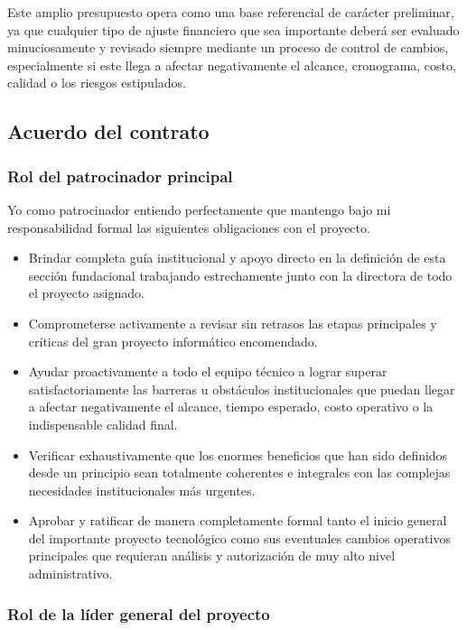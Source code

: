 \documentclass[11pt,spanish]{article}
\begin{document}
Este amplio presupuesto opera como una base referencial de carácter preliminar, ya que cualquier tipo de ajuste financiero que sea importante deberá ser evaluado minuciosamente y revisado siempre mediante un proceso de control de cambios, especialmente si este llega a afectar negativamente el alcance, cronograma, costo, calidad o los riesgos estipulados.

\subsection{Acuerdo del contrato}

\subsubsection{Rol del patrocinador principal}

Yo como patrocinador entiendo perfectamente que mantengo bajo mi responsabilidad formal las siguientes obligaciones con el proyecto.

\begin{itemize}
    \item Brindar completa guía institucional y apoyo directo en la definición de esta sección fundacional trabajando estrechamente junto con la directora de todo el proyecto asignado.
    \item Comprometerse activamente a revisar sin retrasos las etapas principales y críticas del gran proyecto informático encomendado.
    \item Ayudar proactivamente a todo el equipo técnico a lograr superar satisfactoriamente las barreras u obstáculos institucionales que puedan llegar a afectar negativamente el alcance, tiempo esperado, costo operativo o la indispensable calidad final.
    \item Verificar exhaustivamente que los enormes beneficios que han sido definidos desde un principio sean totalmente coherentes e integrales con las complejas necesidades institucionales más urgentes.
    \item Aprobar y ratificar de manera completamente formal tanto el inicio general del importante proyecto tecnológico como sus eventuales cambios operativos principales que requieran análisis y autorización de muy alto nivel administrativo.
\end{itemize}

\subsubsection{Rol de la líder general del proyecto}
\end{document}
